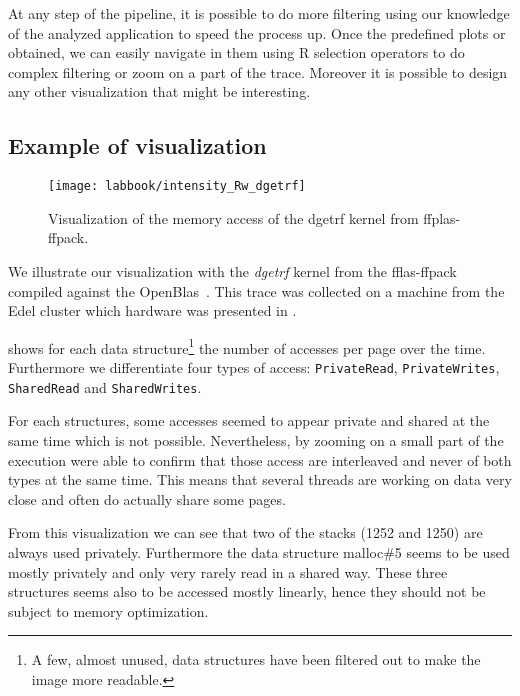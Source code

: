 At any step of the pipeline, it is possible to do more filtering using our knowledge of the analyzed application to speed the process up.
Once the predefined plots or obtained, we can easily navigate in them using \gls{R} selection operators to do complex filtering or zoom on a part of the trace.
Moreover it is possible to design any other visualization that might be interesting.

\subsection{Example of visualization}

\begin{figure}[htb]
    \centering
    \texttt{[image: labbook/intensity\_Rw\_dgetrf]}
    \caption{Visualization of the memory access of the dgetrf kernel from ffplas-ffpack.}
    \label{fig:dgetrf-intensity}
\end{figure}

We illustrate our visualization with the \emph{dgetrf} kernel from the fflas-ffpack~\cite{group16FFLASFFPACK} compiled against the OpenBlas~\cite{Chothia16OpenBlas}.
This trace was collected on a machine from the Edel cluster which hardware was presented in .

 shows for each data structure\footnote{
    A few, almost unused, data structures have been filtered out to make the image more readable.}
    the number of accesses per page over the time.
Furthermore we differentiate four types of access: \texttt{PrivateRead}, \texttt{PrivateWrites}, \texttt{SharedRead} and \texttt{SharedWrites}.

For each structures, some accesses seemed to appear private and shared at the same time which is not possible.
Nevertheless, by zooming on a small part of the execution were able to confirm that those access are interleaved and never of both types at the same time.
This means that several threads are working on data very close and often do actually share some pages.

From this visualization we can see that two of the stacks (1252 and 1250) are always used privately.
Furthermore the data structure malloc\#5 seems to be used mostly privately and only very rarely read in a shared way.
These three structures seems also to be accessed mostly linearly, hence they should not be subject to memory optimization.



